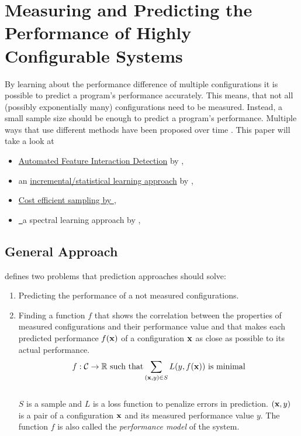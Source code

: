 \section{Measuring and Predicting the Performance of Highly Configurable Systems}\label{sec:measuring}

By learning about the performance difference of multiple configurations it is possible to predict a program's performance accurately. This means, that not all (possibly exponentially many) configurations need to be measured. Instead, a small sample size should be enough to predict a program's performance. Multiple ways that use different methods have been proposed over time \cite{FasterDiscoveryofFasterSystemConfigurationsSiegmund2017}. This paper will take a look at
\begin{itemize}
	\item \hyperref[sec:AFID]{Automated Feature Interaction Detection} by \citet{AutomatedFeatureDetectionSiegmund2012},
	\item an \hyperref[sec:VAPP]{incremental/statistical learning approach} by \citet{VariabilityAwarePerformancePredictionJianmeiSigmundApel},
	\item \hyperref[sec:CESampling]{Cost efficient sampling by \citet{CostEfficientSampling_Gou_Siegmund_2015}},
	\item \hyperref[sec:WHAT]{\WHAT~}a spectral learning approach by \citet{FasterDiscoveryofFasterSystemConfigurationsSiegmund2017},
\end{itemize}

\subsection{General Approach}

\citet{VariabilityAwarePerformancePredictionJianmeiSigmundApel} defines two problems that prediction approaches should solve:
\begin{enumerate}
	\item Predicting the performance of a not measured configurations.
	\item Finding a function $f$ that shows the correlation between the properties of measured configurations and their performance value and that makes each predicted performance $f(\mathrm{\mathbf{x}})$ of a configuration $\mathrm{\mathbf{x}}$ as close as possible to its actual performance.\\	
	\begin{equation}
	f : \mathcal{C} \rightarrow  \mathbb{R} \text{ such that} \sum_{(\mathrm{\mathbf{x}},y) \in S} L(y,f(\mathrm{\mathbf{x}})) \text{ is minimal}
	\end{equation}\\
	$S$ is a sample and	$L$ is a loss function to penalize errors in prediction. $(\mathrm{\mathbf{x}},y)$ is a pair of a configuration $\mathrm{\mathbf{x}}$ and its measured performance value $y$. The function $f$ is also called the \textit{performance model} of the system.
\end{enumerate}

